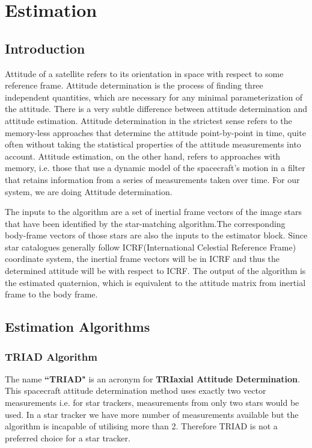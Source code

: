 \documentclass[../../main.tex]{subfiles}
\begin{document}
\section{Estimation}
{

\subsection{Introduction}
{
Attitude of a satellite refers to its orientation in space with respect to some reference frame. Attitude determination is the process of finding three independent quantities, which are necessary for any minimal parameterization of the attitude. There is a very subtle difference between attitude determination and attitude estimation. Attitude determination in the strictest sense refers to the memory-less approaches that determine the attitude point-by-point in time, quite often without taking the statistical properties of the attitude measurements into account. Attitude estimation, on the other hand, refers to approaches with memory, i.e. those that use a dynamic model of the spacecraft’s motion in a filter that retains information from a series of measurements taken over time. For our system, we are doing Attitude determination.

The inputs to the algorithm are a set of inertial frame vectors of the image stars that have been identified by the star-matching algorithm.The corresponding body-frame vectors of those stars are also the inputs to the estimator block. Since star catalogues generally follow ICRF(International Celestial Reference Frame) coordinate system, the inertial frame vectors will be in ICRF and thus the determined attitude will be with respect to ICRF. The output of the algorithm is the estimated quaternion, which is equivalent to the attitude matrix from inertial frame to the body frame.
}

\subsection{Estimation Algorithms}  
{

\subsubsection{TRIAD Algorithm}
{
The name \textbf{``TRIAD"} is an acronym for \textbf{TRIaxial Attitude Determination}. This spacecraft attitude determination method uses exactly two vector measurements i.e. for star trackers, measurements from only two stars would be used. In a star tracker we have more number of measurements available but the algorithm is incapable of utilising more than 2. Therefore TRIAD is not a preferred choice for a star tracker.
}


}}
\end{document}
